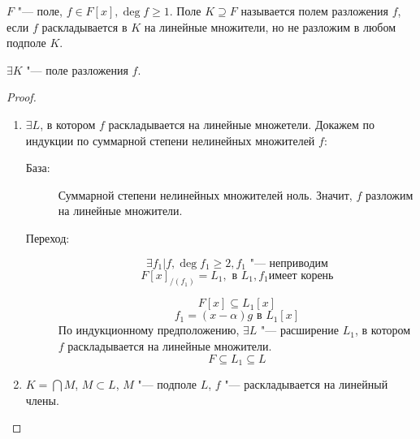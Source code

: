 \begin{Def}
$F$ "--- поле, $f \in F[x], \deg f \geq 1$. Поле $K \supseteq F$ называется полем разложения $f$, если $f$ раскладывается в $K$ на линейные множители, но не разложим в любом подполе $K$.
\end{Def}
\begin{theorem}
$\exists K$ "--- поле разложения $f$.
\end{theorem}
\begin{proof}
\begin{enumerate}
\item $\exists L$, в котором $f$ раскладывается на линейные множетели.
Докажем по индукции по суммарной степени нелинейных множителей $f$:
\begin{description}
\item[База:] Суммарной степени нелинейных множителей ноль. 
Значит, $f$ разложим на линейные множители.
\item[Переход:] 
$$\exists f_1 | f, \deg f_1 \geq 2, f_1 \text{ "--- неприводим}$$
$$F[x]_{/(f_1)} = L_1, \text{ в } L_1, f_1 \text{имеет корень}$$

$$F[x] \subseteq L_1[x]$$
$$f_1 = (x - \alpha)g \text{ в } L_1[x]$$
По индукционному предположению, $\exists L$ "--- расширение $L_1$, в котором $f$ раскладывается на линейные множители.
$$F \subseteq L_1 \subseteq L$$
\end{description}
\item $K = \bigcap M$, $M \subset L$, $M$ "--- подполе $L$, $f$ "--- раскладывается на линейный члены.
\end{enumerate}
\end{proof}
